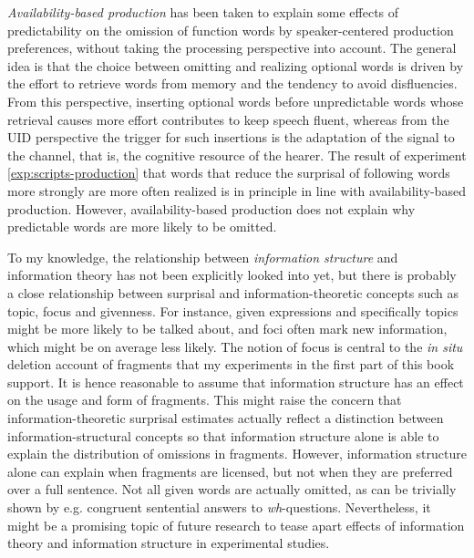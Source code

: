 \noindent\textit{Availability-based production} \citep{ferreira.dell2000} has been taken to explain some effects of predictability on the omission of function words by speaker-centered production preferences, without taking the processing perspective into account. The general idea is that the choice between omitting and realizing optional words is driven by the effort to retrieve words from memory and the tendency to avoid disfluencies. From this perspective, inserting optional words before unpredictable words whose retrieval causes more effort contributes to keep speech fluent, whereas from the UID perspective the trigger for such insertions is the adaptation of the signal to the channel, that is, the cognitive resource of the hearer. The result of experiment \ref{exp:scripts-production} that words that reduce the surprisal of following words more strongly are more often realized is in principle in line with availability-based production. However, availability-based production does not explain why predictable words are more likely to be omitted.

To my knowledge, the relationship between \textit{information structure} and information theory has not been explicitly looked into yet, but there is probably a close relationship between surprisal and information-theoretic concepts such as topic, focus and givenness. For instance, given expressions and specifically topics might be more likely to be talked about, and foci often mark new information, which might be on average less likely. The notion of focus is central to the \textit{in situ} deletion account of fragments that my experiments in the first part of this book support. It is hence reasonable to assume that information structure has an effect on the usage and form of fragments. This might raise the concern that information-theoretic surprisal estimates actually reflect a distinction between information-structural concepts so that information structure alone is able to explain the distribution of omissions in fragments. However, information structure alone can explain when fragments are licensed, but not when they are preferred over a full sentence. Not all given words are actually omitted, as can be trivially shown by e.g. congruent sentential answers to \textit{wh}-questions. Nevertheless, it might be a promising topic of future research to tease apart effects of information theory and information structure in experimental studies.

